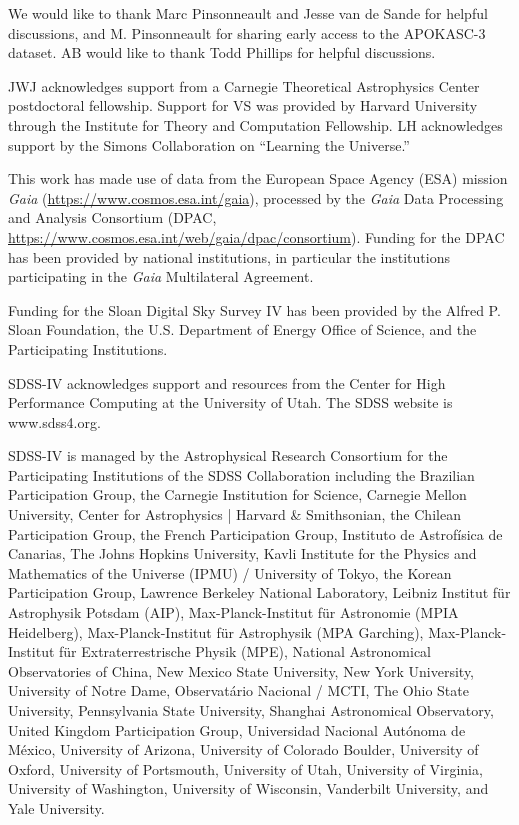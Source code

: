 \documentclass[twocolumn,linenumbers]{aastex631}
\begin{document}
\begin{acknowledgements}
  We would like to thank Marc Pinsonneault and Jesse van de Sande for helpful discussions, and M. Pinsonneault for sharing early access to the APOKASC-3 dataset. AB would like to thank Todd Phillips for helpful discussions.

  JWJ acknowledges support from a Carnegie Theoretical Astrophysics Center postdoctoral fellowship. Support for VS was provided by Harvard University through the Institute for Theory and Computation Fellowship. LH acknowledges support by the Simons Collaboration on ``Learning the Universe.''

  This work has made use of data from the European Space Agency (ESA) mission {\it Gaia} (\url{https://www.cosmos.esa.int/gaia}), processed by the {\it Gaia} Data Processing and Analysis Consortium (DPAC, \url{https://www.cosmos.esa.int/web/gaia/dpac/consortium}). Funding for the DPAC has been provided by national institutions, in particular the institutions participating in the {\it Gaia} Multilateral Agreement.
  
  Funding for the Sloan Digital Sky 
  Survey IV has been provided by the 
  Alfred P. Sloan Foundation, the U.S. 
  Department of Energy Office of 
  Science, and the Participating 
  Institutions. 
  
  SDSS-IV acknowledges support and 
  resources from the Center for High 
  Performance Computing  at the 
  University of Utah. The SDSS 
  website is www.sdss4.org.
  
  SDSS-IV is managed by the 
  Astrophysical Research Consortium 
  for the Participating Institutions 
  of the SDSS Collaboration including 
  the Brazilian Participation Group, 
  the Carnegie Institution for Science, 
  Carnegie Mellon University, Center for 
  Astrophysics | Harvard \& 
  Smithsonian, the Chilean Participation 
  Group, the French Participation Group, 
  Instituto de Astrof\'isica de 
  Canarias, The Johns Hopkins 
  University, Kavli Institute for the 
  Physics and Mathematics of the 
  Universe (IPMU) / University of 
  Tokyo, the Korean Participation Group, 
  Lawrence Berkeley National Laboratory, 
  Leibniz Institut f\"ur Astrophysik 
  Potsdam (AIP),  Max-Planck-Institut 
  f\"ur Astronomie (MPIA Heidelberg), 
  Max-Planck-Institut f\"ur 
  Astrophysik (MPA Garching), 
  Max-Planck-Institut f\"ur 
  Extraterrestrische Physik (MPE), 
  National Astronomical Observatories of 
  China, New Mexico State University, 
  New York University, University of 
  Notre Dame, Observat\'ario 
  Nacional / MCTI, The Ohio State 
  University, Pennsylvania State 
  University, Shanghai 
  Astronomical Observatory, United 
  Kingdom Participation Group, 
  Universidad Nacional Aut\'onoma 
  de M\'exico, University of Arizona, 
  University of Colorado Boulder, 
  University of Oxford, University of 
  Portsmouth, University of Utah, 
  University of Virginia, University 
  of Washington, University of 
  Wisconsin, Vanderbilt University, 
  and Yale University.


\end{acknowledgements}
\end{document}
